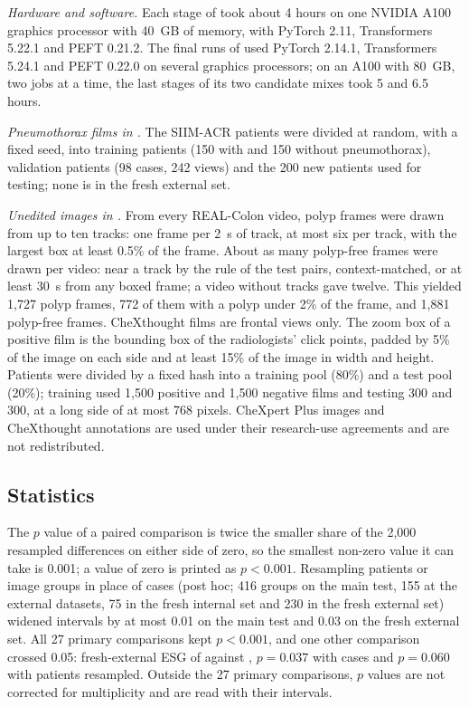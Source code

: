 \emph{Hardware and software.} Each stage of \ms{} took about 4 hours on one NVIDIA A100 graphics processor with 40~GB of memory, with PyTorch 2.11, Transformers 5.22.1 and PEFT 0.21.2. The final runs of \msn{} used PyTorch 2.14.1, Transformers 5.24.1 and PEFT 0.22.0 on several graphics processors; on an A100 with 80~GB, two jobs at a time, the last stages of its two candidate mixes took 5 and 6.5 hours.

\emph{Pneumothorax films in \msp.} The SIIM-ACR patients were divided at random, with a fixed seed, into training patients (150 with and 150 without pneumothorax), validation patients (98 cases, 242 views) and the 200 new patients used for testing; none is in the fresh external set.

\emph{Unedited images in \msn.} From every REAL-Colon video, polyp frames were drawn from up to ten tracks: one frame per 2~s of track, at most six per track, with the largest box at least 0.5\% of the frame. About as many polyp-free frames were drawn per video: near a track by the rule of the test pairs, context-matched, or at least 30~s from any boxed frame; a video without tracks gave twelve. This yielded 1,727 polyp frames, 772 of them with a polyp under 2\% of the frame, and 1,881 polyp-free frames. CheXthought films are frontal views only. The zoom box of a positive film is the bounding box of the radiologists' click points, padded by 5\% of the image on each side and at least 15\% of the image in width and height. Patients were divided by a fixed hash into a training pool (80\%) and a test pool (20\%); training used 1,500 positive and 1,500 negative films and testing 300 and 300, at a long side of at most 768 pixels. CheXpert Plus images and CheXthought annotations are used under their research-use agreements and are not redistributed.

\subsection{Statistics}
\label{sec:s_stats}

The $p$ value of a paired comparison is twice the smaller share of the 2,000 resampled differences on either side of zero, so the smallest non-zero value it can take is 0.001; a value of zero is printed as $p < 0.001$. Resampling patients or image groups in place of cases (post hoc; 416 groups on the main test, 155 at the external datasets, 75 in the fresh internal set and 230 in the fresh external set) widened intervals by at most 0.01 on the main test and 0.03 on the fresh external set. All 27 primary comparisons kept $p < 0.001$, and one other comparison crossed 0.05: fresh-external ESG of \ms{} against \opus, $p = 0.037$ with cases and $p = 0.060$ with patients resampled. Outside the 27 primary comparisons, $p$ values are not corrected for multiplicity and are read with their intervals.

